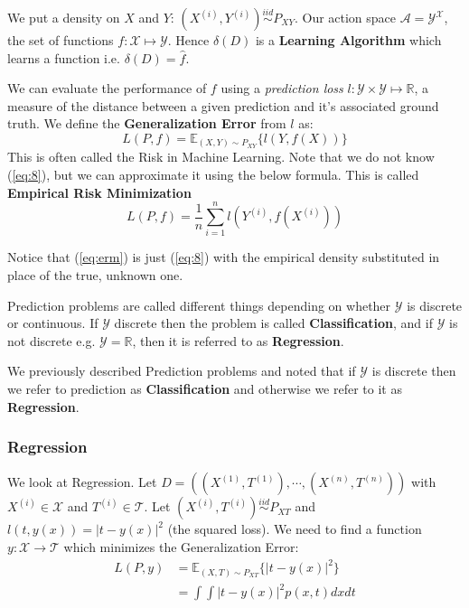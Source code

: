 \documentclass[]{article}
\theoremstyle{mattstyle}
\theoremstyle{definition}
\begin{document}
We put a density on $X$ and $Y$: $(X^{(i)},Y^{(i)}) \overset{iid}{\sim} P_{XY}$. Our action space $\mathcal{A} = \mathcal{Y}^\mathcal{X}$, the set of functions $f: \mathcal{X}\mapsto \mathcal{Y}$. Hence \(\delta(D)\) is a \textbf{Learning Algorithm} which learns a function i.e. $\delta(D) = \hat{f}$. 

We can evaluate the performance of $f$ using a \emph{prediction loss} $l: \mathcal{Y} \times \mathcal{Y} \mapsto \mathbb{R}$, a measure of the distance between a given prediction and it’s associated ground truth. We define the \textbf{Generalization Error} from $l$ as:
\begin{equation}\label{eq:8}
L(P,f) = \mathbb{E}_{(X,Y)\sim P_{XY}}\{l(Y,f(X)) \}
\end{equation}
This is often called the Risk in Machine Learning. Note that we do not know (\ref{eq:8}), but we can approximate it using the below formula. This is called \textbf{Empirical Risk Minimization}
\begin{equation}\label{eq:erm}
L(P,f) = \frac{1}{n}\sum_{i=1}^n l\left(Y^{(i)},f(X^{(i)})\right)
\end{equation}

Notice that (\ref{eq:erm}) is just (\ref{eq:8}) with the empirical density substituted in place of the true, unknown one.

Prediction problems are called different things depending on whether $\mathcal{Y}$ is discrete or continuous. If $\mathcal{Y}$ discrete then the problem is called \textbf{Classification}, and if $\mathcal{Y}$ is not discrete e.g. $\mathcal{Y} = \mathbb{R}$, then it is referred to as \textbf{Regression}.

We previously described Prediction problems and noted that if $\mathcal{Y}$ is discrete then we refer to prediction as \textbf{Classification} and otherwise we refer to it as \textbf{Regression}. 

\subsubsection{Regression}
We look at Regression. Let $D=((X^{(1)},T^{(1)}), \cdots, (X^{(n)},T^{(n)}))$ with $X^{(i)} \in \mathcal{X}$ and $T^{(i)} \in \mathcal{T}$. Let $(X^{(i)},T^{(i)}) \overset{iid}{\sim} P_{XT}$ and $l(t, y(x)) = | t - y(x) |^2$ (the squared loss).
We need to find a function $y: \mathcal{X} \rightarrow \mathcal{T}$ which minimizes the Generalization Error:
\begin{align*}
L(P,y) &= \mathbb{E}_{(X,T)\sim P_{XT}}\{| t - y(x) |^2\}\\
&= \int \int | t - y(x) |^2 p(x, t) dx dt
\end{align*}
\end{document}

